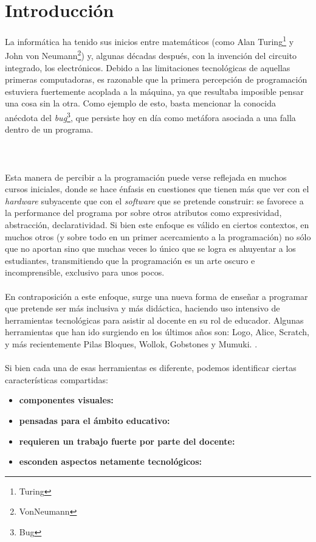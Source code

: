 
\newcommand{\caracteristica}[1]{\item \textbf{#1:}}

\section{Introducción}
La informática ha tenido sus inicios entre matemáticos (como Alan Turing\footnote{Turing} y John von Neumann\footnote{VonNeumann}) y, algunas décadas después, con la invención del circuito integrado, los electrónicos. Debido a las limitaciones tecnológicas de aquellas primeras computadoras, es razonable que la primera percepción de programación estuviera fuertemente acoplada a la máquina, ya que resultaba imposible pensar una cosa sin la otra. Como ejemplo de esto, basta mencionar la conocida anécdota del \textit{bug}\footnote{Bug}, que persiste hoy en día como metáfora asociada a una falla dentro de un programa.
\\\\
\\\\
Esta manera de percibir a la programación puede verse reflejada en muchos cursos iniciales, donde se hace énfasis en cuestiones que tienen más que ver con el \textit{hardware} subyacente que con el \textit{software} que se pretende construir: se favorece a la performance del programa por sobre otros atributos como expresividad, abstracción, declaratividad. Si bien este enfoque es válido en ciertos contextos, en muchos otros (y sobre todo en un primer acercamiento a la programación) no sólo que no aportan sino que muchas veces lo único que se logra es ahuyentar a los estudiantes, transmitiendo que la programación es un arte oscuro e incomprensible, exclusivo para unos pocos.
\\\\
En contraposición a este enfoque, surge una nueva forma de enseñar a programar que pretende ser más inclusiva y más didáctica, haciendo uso intensivo de herramientas tecnológicas para asistir al docente en su rol de educador. Algunas herramientas que han ido surgiendo en los últimos años son: Logo, Alice, Scratch, y más recientemente Pilas Bloques, Wollok, Gobstones y Mumuki. .
\\\\
Si bien cada una de esas herramientas es diferente, podemos identificar ciertas características compartidas:
\begin{itemize}
  \caracteristica{componentes visuales}
  \caracteristica{pensadas para el ámbito educativo}
  \caracteristica{requieren un trabajo fuerte por parte del docente}
  \caracteristica{esconden aspectos netamente tecnológicos}
\end{itemize}

